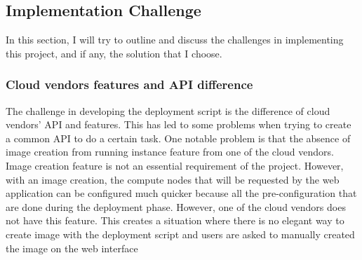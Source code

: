 \subsection{Implementation Challenge}


In this section, I will try to outline and discuss the challenges in implementing this project, and if any, the solution that I choose.

\subsubsection{Cloud vendors features and API difference}

The challenge in developing the deployment script is the difference of cloud vendors' API and features.  This has led to some problems when trying to create a common API to do a certain task. One notable problem is that the absence of image creation from running instance feature from one of the cloud vendors. Image creation feature is not an essential requirement of the project. However, with an image creation, the compute nodes that will be requested by the web application can be configured much quicker because all the pre-configuration that are done during the deployment phase. However, one of the cloud vendors does not have this feature. This creates a situation where there is no elegant way to create image with the deployment script and users are asked to manually created the image on the web interface

\vspace{1cm}

\noindent%
\begin{minipage}{\linewidth}%
\label{fig:hemeweb-challenge-1}%
\end{minipage}

